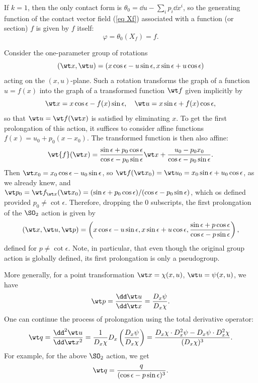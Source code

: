 \begin{example}
    If $k=1$, then the only contact form is $\theta_0=\dd u-\sum_ip_i\dd x^i$, so the generating function of the contact vector field (\ref{eq Xf}) associated with a function (or section) $f$ is given by $f$ itself:
    \[\varphi=\theta_0(X_f)=f.\]
\end{example}

\begin{example}\label{ex prolongation SO2}
    Consider the one-parameter group of rotations 
    \[(\wt x,\wt u)=(x\cos \epsilon-u\sin\epsilon,x\sin\epsilon+u\cos\epsilon)\]
    acting on the $(x,u)$-plane. Such a rotation transforms the graph of a function $u=f(x)$ into the graph of a transformed function $\wt f$ given implicitly by 
    \[\wt x=x\cos \epsilon-f(x)\sin \epsilon,\quad \wt u=x\sin\epsilon+f(x)\cos\epsilon,\]
    so that $\wt u=\wt f(\wt x)$ is satisfied by eliminating $x$. To get the first prolongation of this action, it suffices to consider affine functions $f(x)=u_0+p_0(x-x_0)$. The transformed function is then also affine:
    \[\wt{f}(\wt x)=\frac{\sin \epsilon+p_0\cos\epsilon}{\cos\epsilon-p_0\sin\epsilon}\wt x+\frac{u_0-p_0 x_0}{\cos\epsilon-p_0\sin\epsilon}.\]
    Then $\wt x_0=x_0\cos\epsilon-u_0\sin\epsilon$, so $\wt f(\wt x_0)=\wt u_0=x_0\sin\epsilon+u_0\cos\epsilon$, as we already knew, and $\wt p_0=\wt f_{\wt x}(\wt x_0)=(\sin \epsilon +p_0\cos\epsilon)/(\cos\epsilon-p_0\sin\epsilon)$, which os defined provided $p_0\neq \cot\epsilon$. Therefore, dropping the $0$ subscripts, the first prolongation of the $\SO_2$ action is given by 
    \[(\wt x,\wt u,\wt p)=\left(x\cos\epsilon-u\sin\epsilon,x\sin\epsilon+u\cos\epsilon,\frac{\sin\epsilon+p\cos\epsilon}{\cos\epsilon-p\sin\epsilon}\right),\]
    defined for $p\neq \cot\epsilon$. Note, in particular, that even though the original group action is globally defined, its first prolongation is only a pseudogroup.

    More generally, for a point transformation $\wt x=\chi(x,u)$, $\wt u=\psi(x,u)$, we have 
    \[\wt p=\frac{\dd \wt u}{\dd \wt x}=\frac{D_x \psi}{D_x\chi}.\]
    One can continue the process of prolongation using the total derivative operator:
    \[\wt q=\frac{\dd^2\wt u}{\dd \wt x^2}=\frac{1}{D_x\chi}D_x\left(\frac{D_x\psi}{D_x\chi}\right)=\frac{D_x\chi \cdot D_x^2 \psi-D_x\psi \cdot D_x^2\chi}{(D_x\chi)^3}.\]
    For example, for the above $\SO_2$ action, we get 
    \[\wt q=\frac{q}{(\cos\epsilon-p\sin\epsilon)^3}.\]
\end{example}

